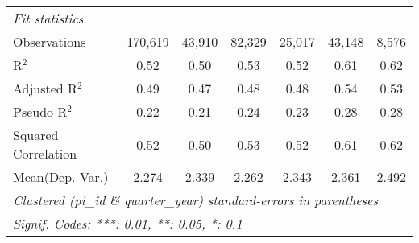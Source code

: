 \begin{tabular}{lcccccc}
   \midrule
   \emph{Fit statistics}\\
   Observations                                               & 170,619      & 43,910        & 82,329      & 25,017        & 43,148       & 8,576\\  
   R$^2$                                                      & 0.52         & 0.50          & 0.53        & 0.52          & 0.61         & 0.62\\  
   Adjusted R$^2$                                             & 0.49         & 0.47          & 0.48        & 0.48          & 0.54         & 0.53\\  
   Pseudo R$^2$                                               & 0.22         & 0.21          & 0.24        & 0.23          & 0.28         & 0.28\\  
   Squared Correlation                                        & 0.52         & 0.50          & 0.53        & 0.52          & 0.61         & 0.62\\  
Mean(Dep. Var.) & 2.274 & 2.339 & 2.262 & 2.343 & 2.361 & 2.492 \\
   \midrule \midrule
   \multicolumn{7}{l}{\emph{Clustered (pi\_id \& quarter\_year) standard-errors in parentheses}}\\
   \multicolumn{7}{l}{\emph{Signif. Codes: ***: 0.01, **: 0.05, *: 0.1}}\\
\end{tabular}
\par\endgroup
